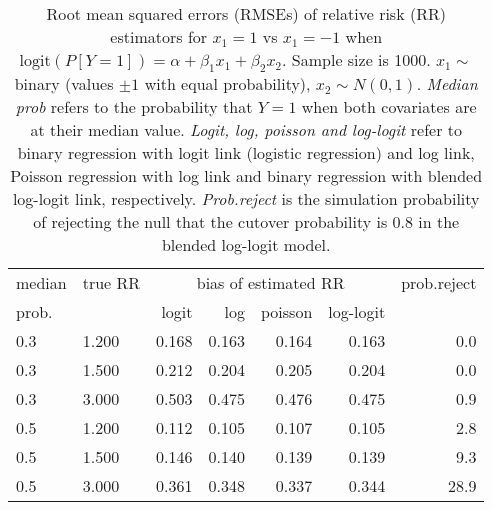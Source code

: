 \documentclass[12pt,a4paper]{article}
\begin{document}
\begin{table}[H] 
\small\sf\centering 
\caption{Root mean squared errors (RMSEs) of relative risk (RR) estimators for $x_1=1$ vs $x_1=-1$ when $\mbox{logit}(P[Y=1])=\alpha+\beta_1 x_1 + \beta_2 x_2$. Sample size is 1000. $x_1 \sim $binary (values $\pm 1$ with equal probability), $x_2 \sim N(0,1)$. {\it Median prob} refers to the probability that $Y=1$ when both covariates are at their median value. {\it Logit, log, poisson and log-logit} refer to binary regression with logit link (logistic regression) and log link, Poisson regression with log link and binary regression with blended log-logit link, respectively. {\it Prob.reject} is the simulation probability of rejecting the null that the cutover probability is $0.8$ in the blended log-logit model.} 
\begin{tabular}{llrrrrr} 
\toprule 
median & true RR & \multicolumn{4}{c}{bias of estimated RR} & prob.reject \\ 
prob. & & logit & log & poisson & log-logit  & \\ \midrule 
0.3 & 1.200 & 0.168 & 0.163 & 0.164 & 0.163 &  0.0 \\  
0.3 & 1.500 & 0.212 & 0.204 & 0.205 & 0.204 &  0.0 \\  
0.3 & 3.000 & 0.503 & 0.475 & 0.476 & 0.475 &  0.9 \\  
0.5 & 1.200 & 0.112 & 0.105 & 0.107 & 0.105 &  2.8 \\  
0.5 & 1.500 & 0.146 & 0.140 & 0.139 & 0.139 &  9.3 \\  
0.5 & 3.000 & 0.361 & 0.348 & 0.337 & 0.344 & 28.9 \\  
\bottomrule 
\end{tabular} 
\end{table} 
\end{document}
